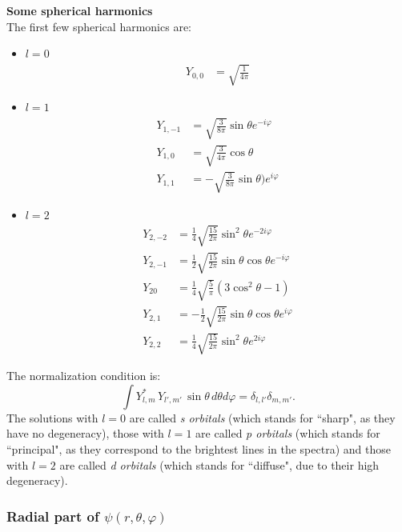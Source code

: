 \begin{tcolorbox}
\textbf{Some spherical harmonics} \\
    The first few spherical harmonics are: 
    \begin{itemize}
    \item \textbf{$l = 0$}
    \begin{align*}
        Y_{0,0} &= \sqrt{\frac{1}{4\pi}}
    \end{align*}
    \item \textbf{$l = 1$}
    \begin{align*}
        Y_{1,-1} &= \sqrt{\frac{3}{8\pi}} \sin{\theta} e^{-i\varphi} \\
        Y_{1,0} &= \sqrt{\frac{3}{4\pi}} \cos{\theta} \\
        Y_{1,1} &= -\sqrt{\frac{3}{8\pi}} \sin{\theta)} e^{i\varphi} 
        \end{align*}
      \item  \textbf{$l = 2$}
        \begin{align*}
        Y_{2,-2} &= \frac{1}{4} \sqrt{\frac{15}{2\pi}} \sin^2{\theta} e^{-2i\varphi} \\
        Y_{2,-1} &= \frac{1}{2} \sqrt{\frac{15}{2\pi}}\sin{\theta} \cos{\theta} e^{-i\varphi} \\
         Y_{20} &= \frac{1}{4} \sqrt{\frac{5}{\pi}}  (3 \cos^2{\theta}-1) \\
        Y_{2,1} &= -\frac{1}{2} \sqrt{\frac{15}{2\pi}}\sin{\theta} \cos{\theta} e^{i\varphi} \\
        Y_{2,2} &= \frac{1}{4} \sqrt{\frac{15}{2\pi}} \sin^2{\theta} e^{2i\varphi}
    \end{align*}
    \end{itemize}
   The normalization condition is:
    \begin{equation*}
        \int Y^*_{l,m} \, Y_{l',m'} \, \sin{\theta} \, d\theta d\varphi = \delta_{l,l'} \delta_{m,m'}.
    \end{equation*}
    The solutions with $l=0$ are called \textit{s orbitals} (which stands for ``sharp", as they have no degeneracy), those with $l=1$ are called \textit{p orbitals} (which stands for ``principal", as they correspond to the brightest lines in the spectra) and those with $l=2$ are called \textit{d orbitals} (which stands for ``diffuse", due to their high degeneracy). 
\end{tcolorbox}

\subsubsection{Radial part of $\psi(r,\theta,\varphi)$}

